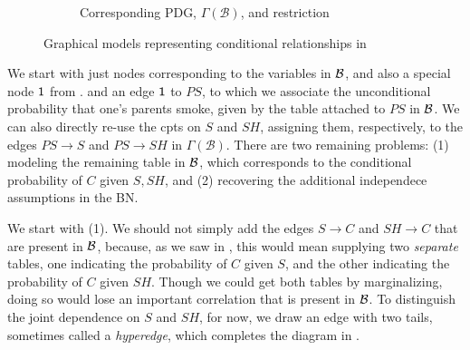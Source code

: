 \documentclass{article}
\newcommand{\MN}{PDG}
\numberwithin{equation}{section}
\begin{document}
\begin{example}[emulating a BN]
\begin{figure*}[ht!]
\begin{subfigure}[b]{0.5\textwidth}
{}
				\caption{Corresponding \MN, $\Gamma(\mathcal B)$, and restriction}
				\label{subfig:smoking-pdg}
			\end{subfigure}
		
			\caption{Graphical models representing conditional relationships in }
			\label{fig:smoking-bn+pdg}
		\end{figure*}
		
%

		We start with just nodes corresponding to the variables in $\cal B$, and also a special node $\sf 1$ from . and an edge ${\sf 1}$ to $\mathit{PS}$, to which we associate the unconditional probability that one's parents smoke, given by the table attached to $\mathit{PS}$ in $\cal B$.
		We can also directly re-use the cpts on $S$ and $\mathit{SH}$, assigning them, respectively, to the edges $PS \to S$ and $PS \to SH$ in $\Gamma(\mathcal B)$. There are two remaining problems: (1) modeling the remaining table in $\cal B$, which corresponds to the conditional probability of $C$ given $S,SH$, and (2) recovering the additional independece assumptions in the BN.
		
		We start with (1). We should not simply add the edges $S \to C$ and $SH \to C$ that are present in $\cal B$, because, as we saw in , this would mean supplying two \emph{separate} tables, one indicating the probability of $C$ given $S$, and the other indicating the probability of $C$ given $\mathit{SH}$. Though we could get both tables by marginalizing, doing so would lose an important correlation that is present in $\cal B$.  
		To distinguish the joint dependence on $S$ and $\mathit{SH}$, for now, we draw an edge with two tails, sometimes called a \emph{hyperedge}, which completes the diagram in .
	\end{example}
\end{document}
